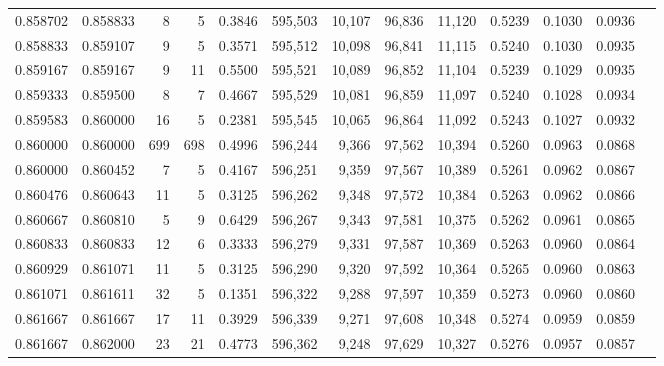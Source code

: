 \begin{tabular}{rrrrrrrrrrrrr}
0.858702 & 0.858833 &     8 &   5 &                                     0.3846 & 595,503 &  10,107 &  96,836 &  11,120 & 0.5239 & 0.1030 & 0.0936 \\
0.858833 & 0.859107 &     9 &   5 &                                     0.3571 & 595,512 &  10,098 &  96,841 &  11,115 & 0.5240 & 0.1030 & 0.0935 \\
0.859167 & 0.859167 &     9 &  11 &                                     0.5500 & 595,521 &  10,089 &  96,852 &  11,104 & 0.5239 & 0.1029 & 0.0935 \\
0.859333 & 0.859500 &     8 &   7 &                                     0.4667 & 595,529 &  10,081 &  96,859 &  11,097 & 0.5240 & 0.1028 & 0.0934 \\
0.859583 & 0.860000 &    16 &   5 &                                     0.2381 & 595,545 &  10,065 &  96,864 &  11,092 & 0.5243 & 0.1027 & 0.0932 \\
0.860000 & 0.860000 &   699 & 698 &                                     0.4996 & 596,244 &   9,366 &  97,562 &  10,394 & 0.5260 & 0.0963 & 0.0868 \\
0.860000 & 0.860452 &     7 &   5 &                                     0.4167 & 596,251 &   9,359 &  97,567 &  10,389 & 0.5261 & 0.0962 & 0.0867 \\
0.860476 & 0.860643 &    11 &   5 &                                     0.3125 & 596,262 &   9,348 &  97,572 &  10,384 & 0.5263 & 0.0962 & 0.0866 \\
0.860667 & 0.860810 &     5 &   9 &                                     0.6429 & 596,267 &   9,343 &  97,581 &  10,375 & 0.5262 & 0.0961 & 0.0865 \\
0.860833 & 0.860833 &    12 &   6 &                                     0.3333 & 596,279 &   9,331 &  97,587 &  10,369 & 0.5263 & 0.0960 & 0.0864 \\
0.860929 & 0.861071 &    11 &   5 &                                     0.3125 & 596,290 &   9,320 &  97,592 &  10,364 & 0.5265 & 0.0960 & 0.0863 \\
0.861071 & 0.861611 &    32 &   5 &                                     0.1351 & 596,322 &   9,288 &  97,597 &  10,359 & 0.5273 & 0.0960 & 0.0860 \\
0.861667 & 0.861667 &    17 &  11 &                                     0.3929 & 596,339 &   9,271 &  97,608 &  10,348 & 0.5274 & 0.0959 & 0.0859 \\
0.861667 & 0.862000 &    23 &  21 &                                     0.4773 & 596,362 &   9,248 &  97,629 &  10,327 & 0.5276 & 0.0957 & 0.0857 \\

\end{tabular}
